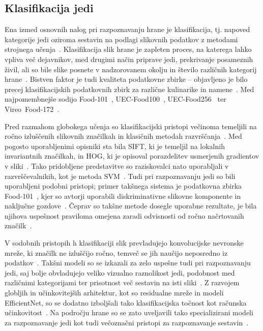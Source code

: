 \documentclass[a4paper,twoside,openright,12pt,slovene]{book}
\begin{document}
        \subsection{Klasifikacija jedi}\label{sct:teorija-klasifikacija}

            Ena izmed osnovnih nalog pri razpoznavanju hrane je klasifikacija, tj. napoved kategorije jedi oziroma sestavin na podlagi slikovnih podatkov z metodami strojnega učenja~\cite{src:min2019survey}.
            Klasifikacija slik hrane je zapleten proces, na katerega lahko vpliva več dejavnikov, med drugimi način priprave jedi, prekrivanje posameznih živil, ali so bile slike posnete v nadzorovanem okolju in število različnih kategorij hrane~\cite{src:konstantakopoulos2023review}. Bistven faktor je tudi kvaliteta podatkovne zbirke -- objavljeno je bilo precej klasifikacijskih podatkovnih zbirk za različne kulinarike in namene~\cite{src:min2019survey}. Med najpomembnejše sodijo \mbox{Food-101}~\cite{src:bossard2014food}, \mbox{UEC-Food100}~\cite{src:matsuda2012recognition}, \mbox{UEC-Food256}~\cite{src:kawano2014automatic} ter \mbox{Vireo Food-172}~\cite{src:chen2016deep}.

            Pred razmahom globokega učenja so klasifikacijski pristopi večinoma temeljili na ročno izluščenih slikovnih značilkah in klasičnih metodah razvrščanja~\cite{src:min2019survey}. Med pogosto uporabljenimi opisniki sta bila SIFT, ki je temeljil na lokalnih invariantnih značilkah, in HOG, ki je opisoval porazdelitev usmerjenih gradientov v sliki~\cite{src:lowe2004sift, src:dalal2005hog}. Tako pridobljene predstavitve so raziskovalci nato uporabljali v razvrščevalnikih, kot je metoda SVM~\cite{src:cortes1995svm}. Tudi pri razpoznavanju jedi so bili uporabljeni podobni pristopi; primer takšnega sistema je podatkovna zbirka Food-101~\cite{src:bossard2014food}, kjer so avtorji uporabili diskriminativne slikovne komponente in naključne gozdove~\cite{src:bossard2014food}. Čeprav so takšne metode dosegle uporabne rezultate, je bila njihova uspešnost praviloma omejena zaradi odvisnosti od ročno načrtovanih značilk~\cite{src:min2019survey}.

            V sodobnih pristopih h klasifikaciji slik prevladujejo konvolucijske nevronske mreže, ki značilk ne izluščijo ročno, temveč se jih naučijo neposredno iz podatkov~\cite{src:krizhevsky2012imagenet}. Takšni modeli so se izkazali za zelo uspešne tudi pri razpoznavanju jedi, saj bolje obvladujejo veliko vizualno raznolikost jedi, podobnost med različnimi kategorijami ter prisotnost več sestavin na isti sliki~\cite{src:kagaya2014food, src:min2019survey, src:konstantakopoulos2023review}. Z razvojem globljih in učinkovitejših arhitektur, kot so residualne mreže in modeli EfficientNet, so se dodatno izboljšali tako klasifikacijska točnost kot računska učinkovitost~\cite{src:he2016deep, src:tan2019efficientnet}. Na področju hrane so se zato uveljavili tako specializirani modeli za razpoznavanje jedi kot tudi večoznačni pristopi za razpoznavanje sestavin~\cite{src:martinel2018wide, src:bolanos2017food}.
\end{document}
